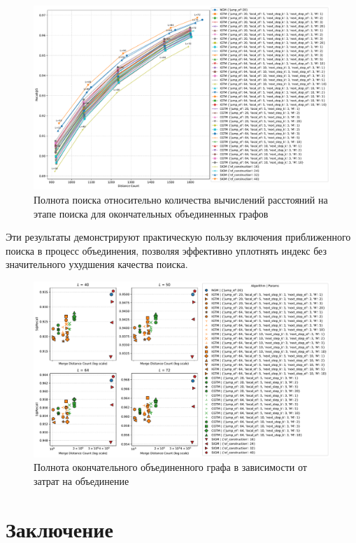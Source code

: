 \documentclass{article}
\begin{document}
\begin{figure}
  \centering
  \includegraphics[width=1.\linewidth]{figs/recall_vs_distance_count.pdf}
  \caption{Полнота поиска относительно количества вычислений расстояний на этапе поиска для окончательных объединенных графов}
\label{fig:fig}
\end{figure}

Эти результаты демонстрируют практическую пользу включения приближенного поиска в процесс объединения, позволяя эффективно уплотнять индекс без значительного ухудшения качества поиска.

\begin{figure}
  \centering
  \includegraphics[width=1.\linewidth]{figs/recall_vs_merge_distance_count.pdf}
  \caption{Полнота окончательного объединенного графа в зависимости от затрат на объединение}
  \label{fig:recall_vs_merge}
\end{figure}

\section{Заключение}
\end{document}
